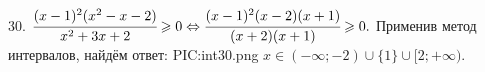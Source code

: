 30. $\cfrac{(x-1)^2(x^2-x-2)}{x^2+3x+2}\geqslant0\Leftrightarrow\cfrac{(x-1)^2(x-2)(x+1)}{(x+2)(x+1)}\geqslant0.$
Применив метод интервалов, найдём ответ:
{{PIC:int30.png}}
$x\in(-\infty;-2)\cup\{1\}\cup[2;+\infty).$\\
